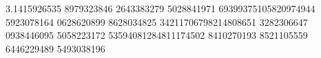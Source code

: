 \documentclass[preview]{standalone}
\begin{document}
\begin{center}
3.1415926535 8979323846 2643383279 5028841971 69399375105820974944 5923078164 0628620899 8628034825 34211706798214808651 3282306647 0938446095 5058223172 53594081284811174502 8410270193 8521105559 6446229489 5493038196
\end{center}
\end{document}
